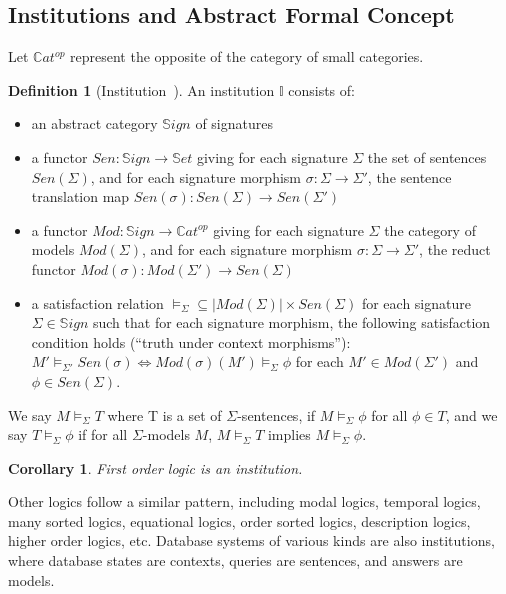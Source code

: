 \documentclass[withindex,glossary]{cam-thesis}
\theoremstyle{plain}
\newtheorem{corollary}[theorem]{Corollary}
\theoremstyle{definition}
\newtheorem{definition}[theorem]{Definition}
\theoremstyle{remark}
\begin{document}
\subsection{Institutions and Abstract Formal Concept}

Let $\mathbb{C}at^{op}$ represent the opposite of the category of small categories.
\begin{definition}[Institution~\citep{goguen2005concept}]
An institution $\mathbb{I}$ consists of:
\begin{itemize}
    \item an abstract category $\mathbb{S}ign$ of signatures
    \item a functor $Sen: \mathbb{S}ign \rightarrow \mathbb{S}et$ giving for each signature $\Sigma$ the set of sentences $Sen(\Sigma)$, and for each signature morphism $\sigma: \Sigma \rightarrow \Sigma'$, the sentence translation map $Sen(\sigma): Sen(\Sigma) \rightarrow Sen(\Sigma')$
    \item a functor $Mod: \mathbb{S}ign \rightarrow \mathbb{C}at^{op}$ giving for each signature $\Sigma$ the category of models $Mod(\Sigma)$, and for each signature morphism $\sigma: \Sigma \rightarrow \Sigma'$, the reduct functor $Mod(\sigma): Mod(\Sigma') \rightarrow Sen(\Sigma)$
    \item a satisfaction relation $\models_\Sigma \subseteq |Mod(\Sigma)| \times Sen(\Sigma)$ for each signature $\Sigma \in \mathbb{S}ign$ such that for each signature morphism, the following satisfaction condition holds (``truth under context morphisms''): $M' \models_{\Sigma'} Sen(\sigma) \iff Mod(\sigma)(M') \models_\Sigma \phi$ for each $M' \in Mod(\Sigma')$ and $\phi \in Sen(\Sigma)$.
\end{itemize}
\end{definition}

We say $M \models_\Sigma T$ where T is a set of $\Sigma$-sentences, if $M \models_\Sigma \phi$ for all $\phi \in T$, and we say $T \models_\Sigma \phi$ if for all $\Sigma$-models $M$, $M \models_\Sigma T$ implies $M \models_\Sigma \phi$.

\begin{corollary}
First order logic is an institution.
\end{corollary}

\begin{displayquote}
Other logics follow a similar pattern, including modal logics, temporal logics, many sorted logics, equational logics, order sorted logics, description logics, higher order logics, etc. Database systems of various kinds are also institutions, where database states are contexts, queries are sentences, and answers are models.
\end{displayquote}
\end{document}
